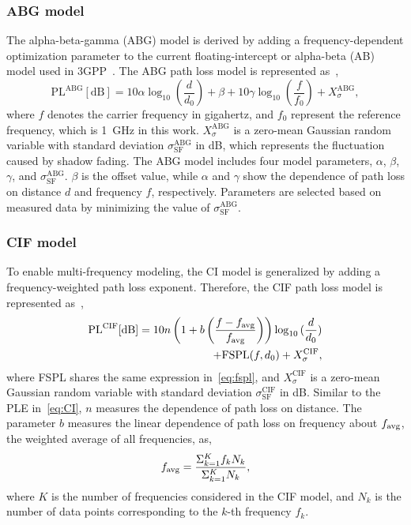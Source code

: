 \documentclass[conference]{IEEEtran}
\begin{document}
\subsubsection{ABG model}
The alpha-beta-gamma (ABG) model is derived by adding a frequency-dependent optimization parameter to the current floating-intercept or alpha-beta (AB) model used in 3GPP~\cite{shu2016investigation}.
The ABG path loss model is represented as~\cite{shu2016investigation},
\begin{equation}
\text{PL}^{\text{ABG}}[\text{dB}]=10\alpha\log_{10}{(\frac{d}{d_0})}+\beta+10\gamma\log_{10}{(\frac{f}{f_0})}+X^{\text{ABG}}_\sigma,
\label{eq:ABG}
\end{equation}
where $f$ denotes the carrier frequency in gigahertz, and $f_0$ represent the reference frequency, which is 1~GHz in this work. $X^{\text{ABG}}_\sigma$ is a zero-mean Gaussian random variable with standard deviation $\sigma^{\text{ABG}}_{\text{SF}}$ in dB, which represents the fluctuation caused by shadow fading. The ABG model includes four model parameters, $\alpha$, $\beta$, $\gamma$, and $\sigma^{\text{ABG}}_{\text{SF}}$. $\beta$ is the offset value, while $\alpha$ and $\gamma$ show the dependence of path loss on distance $d$ and frequency $f$, respectively. Parameters are selected based on measured data by minimizing the value of $\sigma^{\text{ABG}}_{\text{SF}}$.

\subsubsection{CIF model}
To enable multi-frequency modeling, the CI model is generalized by adding a frequency-weighted path loss exponent. Therefore, the CIF path loss model is represented as~\cite{shu2016investigation},
\begin{equation}
\begin{split}
\text{PL}^{\text{CIF}}[\text{dB}]=10n\left(1+b\left(\frac{f-f_{\rm avg}}{f_{\rm avg}}\right)\right)\log_{10}{(\frac{d}{d_0})}\\
+\text{FSPL}(f,d_0)+X^{\text{CIF}}_\sigma,
\end{split}
\label{eq:CIF}
\end{equation}
where FSPL shares the same expression in~\eqref{eq:fspl}, and $X^{\text{CIF}}_\sigma$ is a zero-mean Gaussian random variable with standard deviation $\sigma^{\text{CIF}}_{\text{SF}}$ in dB.
Similar to the PLE in~\eqref{eq:CI}, $n$ measures the dependence of path loss on distance. The parameter $b$ measures the linear dependence of path loss on frequency about $f_{\rm avg}$, the weighted average of all frequencies, as,
\begin{equation}
f_{\rm avg} = \frac{\Sigma_{k=1}^{K}f_k N_k}{\Sigma_{k=1}^{K} N_k},
\label{eq:avg_freq}
\end{equation}
where $K$ is the number of frequencies considered in the CIF model, and $N_k$ is the number of data points corresponding to the $k$-th frequency $f_k$.
\end{document}
